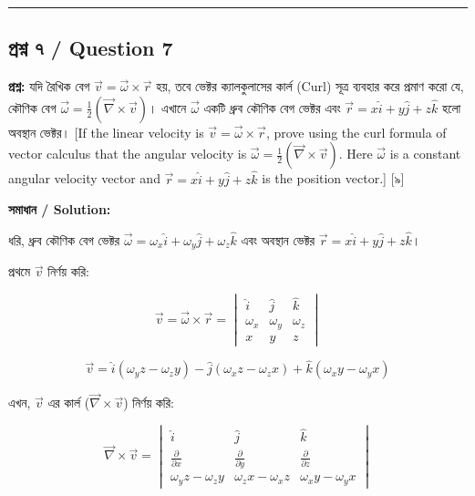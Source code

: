 \documentclass[11pt, a4paper]{article}
\begin{document}
\vspace{1em}
\noindent\rule{\textwidth}{0.4pt}
\vspace{1em}

\subsection*{প্রশ্ন ৭ / Question 7}
\textbf{প্রশ্ন:} যদি রৈখিক বেগ $\vec{v} = \vec{\omega} \times \vec{r}$ হয়, তবে ভেক্টর ক্যালকুলাসের কার্ল (Curl) সূত্র ব্যবহার করে প্রমাণ করো যে, কৌণিক বেগ $\vec{\omega} = \frac{1}{2}(\vec{\nabla} \times \vec{v})$। এখানে $\vec{\omega}$ একটি ধ্রুব কৌণিক বেগ ভেক্টর এবং $\vec{r} = x\hat{i} + y\hat{j} + z\hat{k}$ হলো অবস্থান ভেক্টর। [If the linear velocity is $\vec{v} = \vec{\omega} \times \vec{r}$, prove using the curl formula of vector calculus that the angular velocity is $\vec{\omega} = \frac{1}{2}(\vec{\nabla} \times \vec{v})$. Here $\vec{\omega}$ is a constant angular velocity vector and $\vec{r} = x\hat{i} + y\hat{j} + z\hat{k}$ is the position vector.] [৯]

\vspace{0.8em}
\textbf{সমাধান / Solution:}

ধরি, ধ্রুব কৌণিক বেগ ভেক্টর $\vec{\omega} = \omega_x\hat{i} + \omega_y\hat{j} + \omega_z\hat{k}$ এবং অবস্থান ভেক্টর $\vec{r} = x\hat{i} + y\hat{j} + z\hat{k}$।

প্রথমে $\vec{v}$ নির্ণয় করি:

$$\vec{v} = \vec{\omega} \times \vec{r} = \begin{vmatrix} \hat{i} & \hat{j} & \hat{k} \\ \omega_x & \omega_y & \omega_z \\ x & y & z \end{vmatrix}$$

$$\vec{v} = \hat{i}(\omega_y z - \omega_z y) - \hat{j}(\omega_x z - \omega_z x) + \hat{k}(\omega_x y - \omega_y x)$$

এখন, $\vec{v}$ এর কার্ল ($\vec{\nabla} \times \vec{v}$) নির্ণয় করি:

$$\vec{\nabla} \times \vec{v} = \begin{vmatrix} \hat{i} & \hat{j} & \hat{k} \\ \frac{\partial}{\partial x} & \frac{\partial}{\partial y} & \frac{\partial}{\partial z} \\ \omega_y z - \omega_z y & \omega_z x - \omega_x z & \omega_x y - \omega_y x \end{vmatrix}$$
\end{document}
